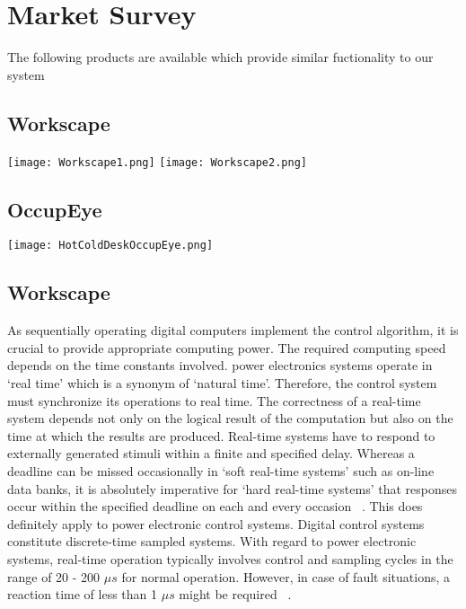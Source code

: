 \chapter{Market Survey}
The following products are available which provide similar fuctionality to our system

\section{Workscape}

\texttt{[image: Workscape1.png]}
\texttt{[image: Workscape2.png]}

\section{OccupEye}

\texttt{[image: HotColdDeskOccupEye.png]}

\section{Workscape}
As sequentially operating digital computers implement the control algorithm, it is crucial to provide appropriate computing power. The required computing speed depends on the time constants involved. power electronics systems operate in `real time' which is a synonym of `natural time'. Therefore, the control system must synchronize its operations to real time. The correctness of a real-time system depends not only on the logical result of the computation but also on the time at which the results are produced. Real-time systems have to respond to externally generated stimuli within a finite and specified delay. Whereas a deadline can be missed occasionally in `soft real-time systems' such as on-line data banks, it is absolutely imperative for `hard real-time systems' that responses occur within the specified deadline on each and every occasion ~\cite{qing}. This does definitely apply to power electronic control systems. Digital control systems constitute discrete-time sampled systems. With regard to power electronic systems, real-time operation typically involves control and sampling cycles in the range of 20 - 200 $\mu s$ for normal operation. However, in case of fault situations, a reaction time of less than 1 $\mu s$ might be required ~\cite{mcc}.
